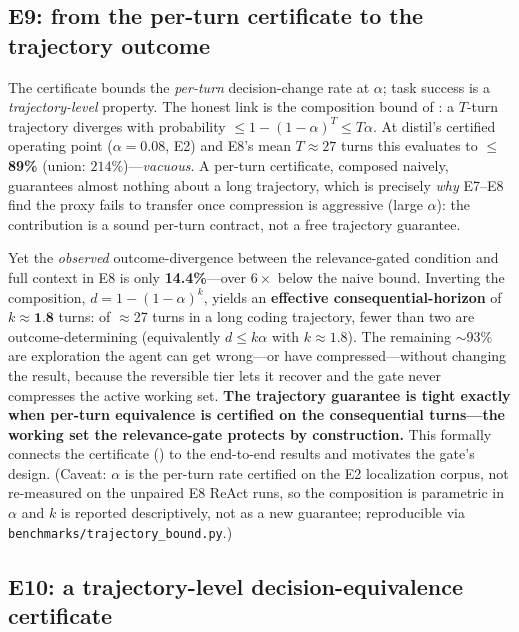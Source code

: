 \documentclass[11pt]{article}
\begin{document}
\subsection{E9: from the per-turn certificate to the trajectory outcome}
\label{sec:e9}

The certificate bounds the \emph{per-turn} decision-change rate at $\alpha$; task success is
a \emph{trajectory-level} property. The honest link is the composition bound of
: a $T$-turn trajectory diverges with probability
$\le 1-(1-\alpha)^T \le T\alpha$. At distil's certified operating point
($\alpha=0.08$, E2) and E8's mean $T\approx27$ turns this evaluates to $\le$\textbf{89\%}
(union: $214\%$)---\emph{vacuous}. A per-turn certificate, composed naively, guarantees
almost nothing about a long trajectory, which is precisely \emph{why} E7--E8 find the proxy
fails to transfer once compression is aggressive (large $\alpha$): the contribution is a
sound per-turn contract, not a free trajectory guarantee.

Yet the \emph{observed} outcome-divergence between the relevance-gated condition and full
context in E8 is only \textbf{14.4\%}---over $6\times$ below the naive bound. Inverting the
composition, $d=1-(1-\alpha)^{k}$, yields an \textbf{effective consequential-horizon} of
$k\approx\textbf{1.8}$ turns: of $\approx$27 turns in a long coding trajectory, fewer than
two are outcome-determining (equivalently $d\le k\alpha$ with $k\approx1.8$). The remaining
$\sim$93\% are exploration the agent can get wrong---or have compressed---without changing
the result, because the reversible tier lets it recover and the gate never compresses the
active working set. \textbf{The trajectory guarantee is tight exactly when per-turn
equivalence is certified on the consequential turns---the working set the relevance-gate
protects by construction.} This formally connects the certificate () to the
end-to-end results and motivates the gate's design. (Caveat: $\alpha$ is the per-turn rate
certified on the E2 localization corpus, not re-measured on the unpaired E8 ReAct runs, so
the composition is parametric in $\alpha$ and $k$ is reported descriptively, not as a new
guarantee; reproducible via \texttt{benchmarks/trajectory\_bound.py}.)

\subsection{E10: a trajectory-level decision-equivalence certificate}
\label{sec:e10}
\end{document}
